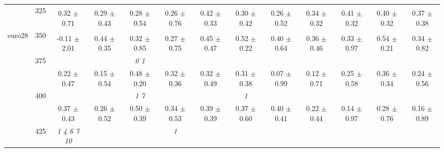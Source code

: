 \begin{table}[h]
{\begin{tabular}{
        ccccccccccccc}
 & \multirow{2}{*}{325}& \cellcolor[HTML]{EFEFEF} & \cellcolor[HTML]{EFEFEF} & \cellcolor[HTML]{EFEFEF} & \cellcolor[HTML]{EFEFEF} & \cellcolor[HTML]{EFEFEF} & \cellcolor[HTML]{EFEFEF} & \cellcolor[HTML]{EFEFEF} & \cellcolor[HTML]{EFEFEF} & \cellcolor[HTML]{EFEFEF} & \cellcolor[HTML]{EFEFEF} & \cellcolor[HTML]{EFEFEF}  \\ 
 & & \cellcolor[HTML]{EFEFEF} 0.32 $\pm$ 0.71& \cellcolor[HTML]{EFEFEF} 0.29 $\pm$ 0.43& \cellcolor[HTML]{EFEFEF} 0.28 $\pm$ 0.54& \cellcolor[HTML]{EFEFEF} 0.26 $\pm$ 0.76& \cellcolor[HTML]{EFEFEF} 0.42 $\pm$ 0.33& \cellcolor[HTML]{EFEFEF} 0.30 $\pm$ 0.42& \cellcolor[HTML]{EFEFEF} 0.26 $\pm$ 0.52& \cellcolor[HTML]{EFEFEF} 0.34 $\pm$ 0.32& \cellcolor[HTML]{EFEFEF} 0.41 $\pm$ 0.32& \cellcolor[HTML]{EFEFEF} 0.40 $\pm$ 0.32& \cellcolor[HTML]{EFEFEF} 0.37 $\pm$ 0.38 \\ 
 \multirow{4}{*}{euro28} & \multirow{2}{*}{350}& & & & & & & & & & &  \\ 
 & & -0.11 $\pm$ 2.01& 0.44 $\pm$ 0.35& 0.32 $\pm$ 0.85& 0.27 $\pm$ 0.75& 0.45 $\pm$ 0.47& 0.52 $\pm$ 0.22& 0.40 $\pm$ 0.64& 0.36 $\pm$ 0.46& 0.33 $\pm$ 0.97& 0.54 $\pm$ 0.21& 0.34 $\pm$ 0.82 \\ 
 & \multirow{2}{*}{375}& \cellcolor[HTML]{EFEFEF} & \cellcolor[HTML]{EFEFEF} & \cellcolor[HTML]{EFEFEF} \textit{ 0 1 }& \cellcolor[HTML]{EFEFEF} & \cellcolor[HTML]{EFEFEF} & \cellcolor[HTML]{EFEFEF} & \cellcolor[HTML]{EFEFEF} & \cellcolor[HTML]{EFEFEF} & \cellcolor[HTML]{EFEFEF} & \cellcolor[HTML]{EFEFEF} & \cellcolor[HTML]{EFEFEF}  \\ 
 & & \cellcolor[HTML]{EFEFEF} 0.22 $\pm$ 0.47& \cellcolor[HTML]{EFEFEF} 0.15 $\pm$ 0.54& \cellcolor[HTML]{EFEFEF} 0.48 $\pm$ 0.20& \cellcolor[HTML]{EFEFEF} 0.32 $\pm$ 0.36& \cellcolor[HTML]{EFEFEF} 0.32 $\pm$ 0.49& \cellcolor[HTML]{EFEFEF} 0.31 $\pm$ 0.38& \cellcolor[HTML]{EFEFEF} 0.07 $\pm$ 0.99& \cellcolor[HTML]{EFEFEF} 0.12 $\pm$ 0.71& \cellcolor[HTML]{EFEFEF} 0.25 $\pm$ 0.58& \cellcolor[HTML]{EFEFEF} 0.36 $\pm$ 0.34& \cellcolor[HTML]{EFEFEF} 0.24 $\pm$ 0.56 \\ 
 & \multirow{2}{*}{400}& & & \textit{ 1 7 }& & & \textit{ 1 }& & & & &  \\ 
 & & 0.37 $\pm$ 0.43& 0.26 $\pm$ 0.52& 0.50 $\pm$ 0.39& 0.34 $\pm$ 0.53& 0.39 $\pm$ 0.39& 0.37 $\pm$ 0.60& 0.40 $\pm$ 0.41& 0.22 $\pm$ 0.44& 0.14 $\pm$ 0.97& 0.28 $\pm$ 0.76& 0.16 $\pm$ 0.89 \\ 
 & \multirow{2}{*}{425}& \cellcolor[HTML]{EFEFEF} \textit{  1  4  6  7 10 }& \cellcolor[HTML]{EFEFEF} & \cellcolor[HTML]{EFEFEF} & \cellcolor[HTML]{EFEFEF} \textit{ 1 }& \cellcolor[HTML]{EFEFEF} & \cellcolor[HTML]{EFEFEF} & \cellcolor[HTML]{EFEFEF} & \cellcolor[HTML]{EFEFEF} & \cellcolor[HTML]{EFEFEF} & \cellcolor[HTML]{EFEFEF} & \cellcolor[HTML]{EFEFEF}  \\ 

\end{tabular}}
\end{table}
